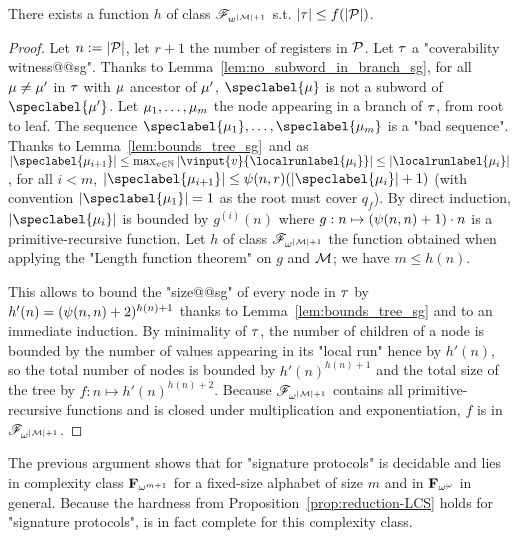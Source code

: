\begin{proposition}
\label{prop:bounded_witness_sg}
There exists a function $h$ of class $\mathscr{F}_{w^{|\mathcal{M}|+1}}$ s.t. $|\tau| \leq f(|\mathcal{P}|)$. 
\end{proposition}
\begin{proof}
Let $n := |\mathcal{P}|$, let $r+1$ the number of registers in $\mathcal{P}$. 
Let $\tau$ a "coverability witness@@sg". Thanks to Lemma~\ref{lem:no_subword_in_branch_sg}, for all $\mu \ne \mu'$ in 
$\tau$ with $\mu$ ancestor of $\mu'$, $\speclabel{\node}$ is not a subword of $\speclabel{\node'}$.  Let $\mu_1, \dots, \mu_m$ the node appearing in a branch of $\tau$, from root to leaf. The sequence $\speclabel{\node_1}, \dots, \speclabel{\node_m}$ is a "bad sequence".
Thanks to Lemma~\ref{lem:bounds_tree_sg}\ and as $\size{\speclabel{\node_{i+1}}} \leq \max_{v \in \nats} \size{\vinput{v}{\localrunlabel{\node_i}}} \leq \size{\localrunlabel{\node_i}}$, for all $i<m$, $\size{\speclabel{\node_{i+1}}} \leq \towerfun(n,r) (\size{\speclabel{\node_{i}}} +1)$ (with convention $\size{\speclabel{\node_1}} = 1$ as the root must cover $q_f$). By direct induction, $\size{\speclabel{\node_i}}$ is bounded by $g^{(i)}(n)$ where $g: n \mapsto (\psi(n,n)+1) \cdot n$ is a primitive-recursive function. Let $h$ of class $\mathscr{F}_{\omega^{|\mathcal{M}|+1}}$ the function obtained when applying the "Length function theorem" on $g$ and $\mathcal{M}$; we have $m \leq h(n)$. 

This allows to bound the "size@@sg" of every node in $\tau$ by $h'(n) = (\psi(n,n)+2)^{h(n) + 1}$ thanks to Lemma~\ref{lem:bounds_tree_sg} and to an immediate induction. 
By minimality of $\tau$, the number of children of a node is bounded by the number of values appearing in its "local run" hence by $h'(n)$, so the total number of nodes is bounded by $h'(n)^{h(n)+1}$ and the total size of the tree by $f:n \mapsto h'(n)^{h(n)+2}$. Because $\mathscr{F}_{\omega^{|\mathcal{M}|+1}}$ contains all primitive-recursive functions and is closed under multiplication and exponentiation, $f$ is in $\mathscr{F}_{\omega^{|\mathcal{M}|+1}}$.
\end{proof}

The previous argument shows that \COVER for "signature protocols" is decidable and lies in complexity class $\mathbf{F}_{\omega^{m+1}}$ for a fixed-size alphabet of size $m$ and in $\mathbf{F}_{\omega^\omega}$ in general. Because the hardness from Proposition~\ref{prop:reduction-LCS} holds for "signature protocols", \COVER is in fact complete for this complexity class.

